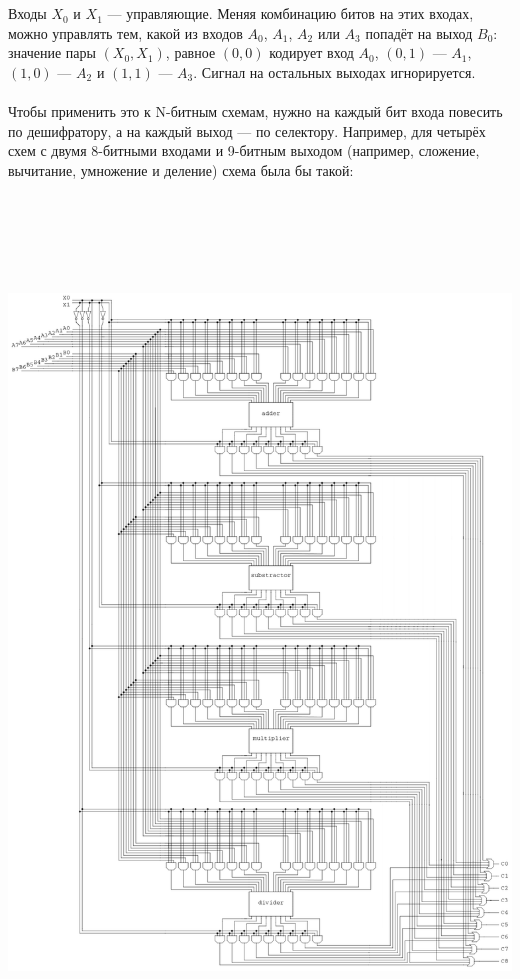 \documentclass[11pt]{book}
\begin{document}
\\ \\
Входы $X_0$ и $X_1$ --- управляющие.
Меняя комбинацию битов на этих входах, можно управлять тем, какой из входов $A_0$, $A_1$, $A_2$ или $A_3$ попадёт на выход $B_0$:
значение пары $(X_0, X_1)$, равное $(0, 0)$ кодирует вход $A_0$, $(0, 1)$ --- $A_1$, $(1, 0)$ --- $A_2$ и $(1, 1)$ --- $A_3$.
Сигнал на остальных выходах игнорируется.
\\ \\
Чтобы применить это к N-битным схемам, нужно на каждый бит входа повесить по дешифратору, а на каждый выход --- по селектору.
Например, для четырёх схем с двумя 8-битными входами и 9-битным выходом (например, сложение, вычитание, умножение и деление) схема была бы такой:
\\ \\
\includegraphics[height=9in]{pic/commands.png}
\end{document}
